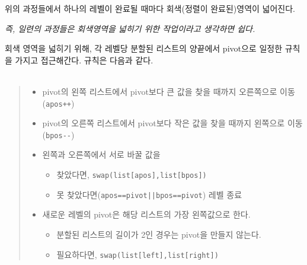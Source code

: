 \documentclass{article}
\begin{document}
\begin{center}
\end{center}




\begin{center}
\end{center}
위의 과정들에서 하나의 레벨이 완료될 때마다 회색(정렬이 완료된)영역이 넓어진다.
\begin{center}
    \textit{즉, 일련의 과정들은 회색영역을 넓히기 위한 작업이라고 생각하면 쉽다.}
\end{center}
회색 영역을 넓히기 위해, 각 레벨당 분할된 리스트의 양끝에서 pivot으로 일정한 규칙을 가지고 접근해간다. 규칙은 다음과 같다.\\\\

\begin{quote}\centering
\begin{itemize}
    \item[]pivot의 왼쪽 리스트에서 pivot보다 큰 값을 찾을 때까지 오른쪽으로 이동(\verb|apos++|) 
    \item[]pivot의 오른쪽 리스트에서 pivot보다 작은 값을 찾을 때까지 왼쪽으로 이동(\verb|bpos--|) 
    \item[]왼쪽과 오른쪽에서 서로 바꿀 값을 
    \begin{itemize}
        \item[]찾았다면, \verb+swap(list[apos],list[bpos])+
        \item[]못 찾았다면(\verb+apos==pivot||bpos==pivot+) 레벨 종료
    \end{itemize}
    \item[]새로운 레벨의 pivot은 해당 리스트의 가장 왼쪽값으로 한다.
    \begin{itemize}
        \item[]분할된 리스트의 길이가 2인 경우는 pivot을 만들지 않는다.
        \item[]필요하다면, \verb+swap(list[left],list[right])+
    \end{itemize}
\end{itemize}
\end{quote}
\end{document}
